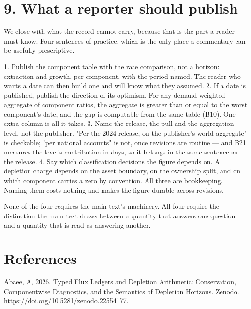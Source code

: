 \documentclass[11pt]{article}
\begin{document}
\vspace{0.8em}

\vspace{0.8em}

\section*{9. What a reporter should publish}\label{9-what-a-reporter-should-publish}

We close with what the record cannot carry, because that is the part a reader must know. Four sentences of practice, which is the only place a commentary can be usefully prescriptive.

1. Publish the component table with the rate comparison, not a horizon: extraction and growth, per component, with the period named. The reader who wants a date can then build one and will know what they assumed. 2. If a date is published, publish the direction of its optimism. For any demand-weighted aggregate of component ratios, the aggregate is greater than or equal to the worst component's date, and the gap is computable from the same table (B10). One extra column is all it takes. 3. Name the release, the pull and the aggregation level, not the publisher. "Per the 2024 release, on the publisher's world aggregate" is checkable; "per national accounts" is not, once revisions are routine --- and B21 measures the level's contribution in days, so it belongs in the same sentence as the release. 4. Say which classification decisions the figure depends on. A depletion charge depends on the asset boundary, on the ownership split, and on which component carries a zero by convention. All three are bookkeeping. Naming them costs nothing and makes the figure durable across revisions.

None of the four requires the main text's machinery. All four require the distinction the main text draws between a quantity that answers one question and a quantity that is read as answering another.

\vspace{0.8em}

\vspace{0.8em}

\section*{References}\label{references}

Abaee, A, 2026. Typed Flux Ledgers and Depletion Arithmetic: Conservation, Componentwise Diagnostics, and the Semantics of Depletion Horizons. Zenodo. \url{https://doi.org/10.5281/zenodo.22554177}.
\end{document}
